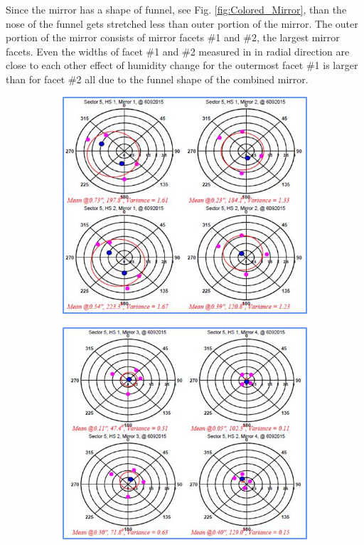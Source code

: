 Since the mirror has a shape of funnel, see Fig. \ref{fig:Colored_Mirror}, than the nose of the funnel gets stretched less than outer portion of the mirror. The outer portion of the mirror consists of mirror facets \#1 and \#2, the largest mirror facets. Even the widths of facet \#1 and \#2 measured in in radial direction are close to each other effect of humidity change for the outermost facet \#1 is larger than for facet \#2 all due to the funnel shape of the combined mirror.

\begin{figure}
\begin{subfigure}[b]{0.49\textwidth}
    \includegraphics[width=1.0\textwidth]{images/GEO_TEST_Sect5_M_1_M_2.jpg}
    \caption{} \label{fig:subfig1_a}
\end{subfigure}
\hspace*{\fill} %
\begin{subfigure}[b]{0.5\textwidth}
    \includegraphics[width=1.0\linewidth]{images/GEO_TEST_Sect5_M_3_M_4.jpg}

\end{subfigure}
\end{figure}
